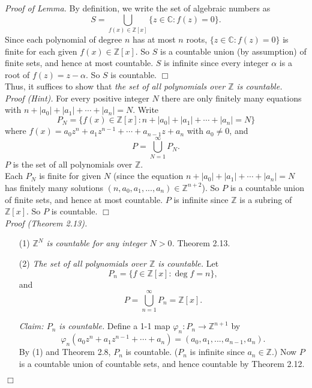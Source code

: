 \documentclass{article}
\begin{document}
\emph{Proof of Lemma.}
By definition, we write the set of algebraic numbers as
$$S = \bigcup_{f(x) \in \mathbb{Z}[x]} \{ z \in \mathbb{C} : f(z) = 0 \}.$$
Since each polynomial of degree $n$ has at most $n$ roots,
$\{ z \in \mathbb{C} : f(z) = 0 \}$ is finite for each given $f(x) \in \mathbb{Z}[x]$.
So $S$ is a countable union (by assumption) of finite sets, and hence at most countable.
$S$ is infinite since every integer $\alpha$ is a root of $f(z) = z - \alpha$.
So $S$ is countable.
$\Box$ \\

Thus, it suffices to show that
\emph{the set of all polynomials over $\mathbb{Z}$ is countable.} \\

\emph{Proof (Hint).}
For every positive integer $N$ there are only finitely many equations with
$n + |a_0| + |a_1| + \cdots + |a_n| = N.$
Write
$$P_N = \{ f(x) \in \mathbb{Z}[x] : n + |a_0| + |a_1| + \cdots + |a_n| = N \}$$
where $f(x) = a_0 z^n + a_1 z^{n-1} + \cdots + a_{n-1} z + a_n$ with $a_0 \neq 0$,
and
$$P = \bigcup_{N = 1}^{\infty} P_N.$$
$P$ is the set of all polynomials over $\mathbb{Z}$. \\

Each $P_N$ is finite for given $N$
(since the equation $n + |a_0| + |a_1| + \cdots + |a_n| = N$
has finitely many solutions
$(n, a_0, a_1, ..., a_n) \in \mathbb{Z}^{n+2}$).
So $P$ is a countable union of finite sets, and hence at most countable.
$P$ is infinite since $\mathbb{Z}$ is a subring of $\mathbb{Z}[x]$.
So $P$ is countable.
$\Box$ \\

\emph{Proof (Theorem 2.13).}
\begin{enumerate}
\item[(1)]
\emph{$\mathbb{Z}^N$ is countable for any integer $N > 0$.}
Theorem 2.13.
\item[(2)]
\emph{The set of all polynomials over $\mathbb{Z}$ is countable.}
Let
$$P_n = \{ f \in \mathbb{Z}[x] : \deg f = n \},$$
and
$$P = \bigcup_{n = 1}^{\infty} P_n = \mathbb{Z}[x].$$

\emph{Claim: $P_n$ is countable.}
Define a 1-1 map $\varphi_n: P_n \rightarrow \mathbb{Z}^{n+1}$ by
$$\varphi_n(a_0 z^n + a_1 z^{n-1} + \cdots + a_n)
= (a_0, a_1, ..., a_{n-1}, a_n).$$
By (1) and Theorem 2.8, $P_n$ is countable.
($P_n$ is infinite since $a_n \in \mathbb{Z}$.)
Now $P$ is a countable union of countable sets,
and hence countable by Theorem 2.12.
\end{enumerate}
$\Box$ \\
\end{document}
